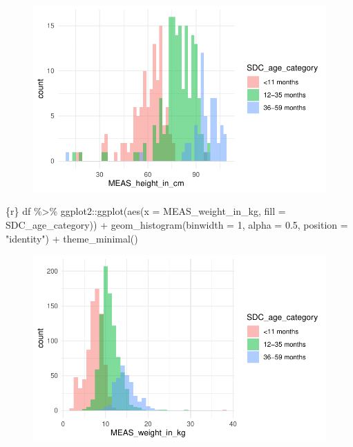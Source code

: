 \documentclass[
  letterpaper,
  DIV=11,
  numbers=noendperiod,
  oneside]{scrreprt}
\newenvironment{Shaded}{\begin{snugshade}}{\end{snugshade}}
\newcommand{\AttributeTok}[1]{\textcolor[rgb]{0.40,0.45,0.13}{#1}}
\newcommand{\DecValTok}[1]{\textcolor[rgb]{0.68,0.00,0.00}{#1}}
\newcommand{\FloatTok}[1]{\textcolor[rgb]{0.68,0.00,0.00}{#1}}
\newcommand{\FunctionTok}[1]{\textcolor[rgb]{0.28,0.35,0.67}{#1}}
\newcommand{\InformationTok}[1]{\textcolor[rgb]{0.37,0.37,0.37}{#1}}
\newcommand{\NormalTok}[1]{\textcolor[rgb]{0.00,0.23,0.31}{#1}}
\newcommand{\SpecialCharTok}[1]{\textcolor[rgb]{0.37,0.37,0.37}{#1}}
\newcommand{\StringTok}[1]{\textcolor[rgb]{0.13,0.47,0.30}{#1}}
\begin{document}
\begin{figure}[H]

{\centering \includegraphics{./ds4ph_day3_session01_practical_session_files/figure-pdf/unnamed-chunk-13-1.pdf}

}

\end{figure}

\begin{Shaded}
\begin{Highlighting}[]
\InformationTok{\textasciigrave{}\textasciigrave{}\textasciigrave{}\{r\}}
\NormalTok{df }\SpecialCharTok{\%\textgreater{}\%}\NormalTok{  ggplot2}\SpecialCharTok{::}\FunctionTok{ggplot}\NormalTok{(}\FunctionTok{aes}\NormalTok{(}\AttributeTok{x =}\NormalTok{ MEAS\_weight\_in\_kg,}
                            \AttributeTok{fill =}\NormalTok{ SDC\_age\_category)) }\SpecialCharTok{+}
  \FunctionTok{geom\_histogram}\NormalTok{(}\AttributeTok{binwidth =} \DecValTok{1}\NormalTok{, }\AttributeTok{alpha =} \FloatTok{0.5}\NormalTok{, }\AttributeTok{position =} \StringTok{"identity"}\NormalTok{) }\SpecialCharTok{+}
  \FunctionTok{theme\_minimal}\NormalTok{()}
\InformationTok{\textasciigrave{}\textasciigrave{}\textasciigrave{}}
\end{Highlighting}
\end{Shaded}

\begin{figure}[H]

{\centering \includegraphics{./ds4ph_day3_session01_practical_session_files/figure-pdf/unnamed-chunk-14-1.pdf}

}

\end{figure}
\end{document}
